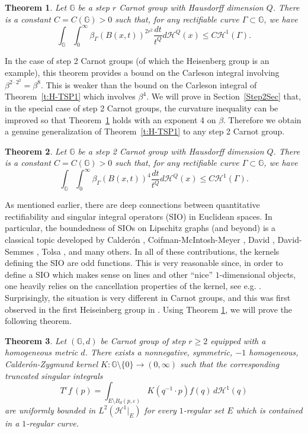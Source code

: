 \documentclass[11pt]{amsart}
\newtheorem{theorem}{Theorem}
\theoremstyle{definition}
\newcommand{\G}{\mathbb G}
\newcommand{\ra}{\rightarrow}
\newcommand{\ha}{\mathcal{H}}
\newcommand{\stm}{\setminus}
\newcommand{\ve}{\varepsilon}
\numberwithin{theorem}{section} \numberwithin{equation}{section}
\begin{document}
\begin{theorem}
\label{TSP}
Let $\mathbb{G}$ be a step $r$ Carnot group with Hausdorff dimension $Q$.  There is a constant $C=C(\mathbb{G})>0$
such that, for any rectifiable curve $\Gamma \subset \mathbb{G}$, we have
$$
\int_{\mathbb{G}} \int_0^{\infty} \beta_{\Gamma}(B(x,t))^{2r^2} \frac{dt}{t^Q} d \mathcal{H}^Q(x) \leq C \mathcal{H}^1(\Gamma).
$$
\end{theorem}
In the case of step 2 Carnot groups (of which the Heisenberg group is an example), 
this theorem provides a bound on the Carleson integral involving $\beta^{2 \cdot 2^2} = \beta^8$.
This is weaker than the bound on the Carleson integral of Theorem~\ref{t:H-TSP1} which involves $\beta^4$.  
We will prove in Section~\ref{Step2Sec} that, in the special case of step 2 Carnot groups, the curvature inequality can be improved so that Theorem~\ref{TSP} holds with an exponent 4 on $\beta$. Therefore we obtain a genuine generalization of Theorem~\ref{t:H-TSP1} to any step 2 Carnot group.
\begin{theorem}
\label{TSP2}
Let $\mathbb{G}$ be a step 2 Carnot group with Hausdorff dimension $Q$.  There is a constant $C=C(\mathbb{G})>0$
such that, for any rectifiable curve $\Gamma \subset \mathbb{G}$, we have
$$
\int_{\mathbb{G}} \int_0^{\infty} \beta_{\Gamma}(B(x,t))^{4} \frac{dt}{t^Q} d \mathcal{H}^Q(x) \leq C \mathcal{H}^1(\Gamma).
$$
\end{theorem}

As mentioned earlier, there are deep connections between quantitative rectifiability and singular integral operators (SIO) in Euclidean spaces. In particular, the boundedness of SIOs on Lipschitz graphs (and beyond) is a classical topic developed by Calder\'on \cite{Calderon}, Coifman-McIntosh-Meyer \cite{CMM}, David \cite{MR956767}, David-Semmes \cite{DS1, DS2}, Tolsa \cite{tolsaplms}, and many others. In all of these contributions, the kernels defining the SIO are odd functions. This is very reasonable since, in order to define a SIO which makes sense on lines and other ``nice'' $1$-dimensional objects, one heavily relies on the cancellation properties of the kernel, see e.g. \cite[Proposition 1, pp 289]{stein}. Surprisingly, the situation is very different in Carnot groups, and this was first observed in the first Heiseinberg group in \cite{ChoLi}. Using Theorem \ref{TSP}, we will prove the following theorem.

\begin{theorem}
\label{siosintro}
Let $(\G,d)$ be Carnot group of step $r\geq 2$ equipped with a homogeneous metric $d$. There exists a nonnegative, symmetric, $-1$ homogeneous, Calder\'on-Zygmund kernel  $K : \G \stm \{0\} \ra (0,\infty)$ 
such that  the corresponding truncated singular integrals
$$T^\ve f\,(p)=\int_{E \stm B_{d}(p,\ve)} K(q^{-1} \cdot p) f(q) \,d \ha^1(q)$$
are uniformly bounded in $L^2(\ha^1 |_E)$ for every $1$-regular set $E$  which is contained in a $1$-regular curve.
\end{theorem}
\end{document}
